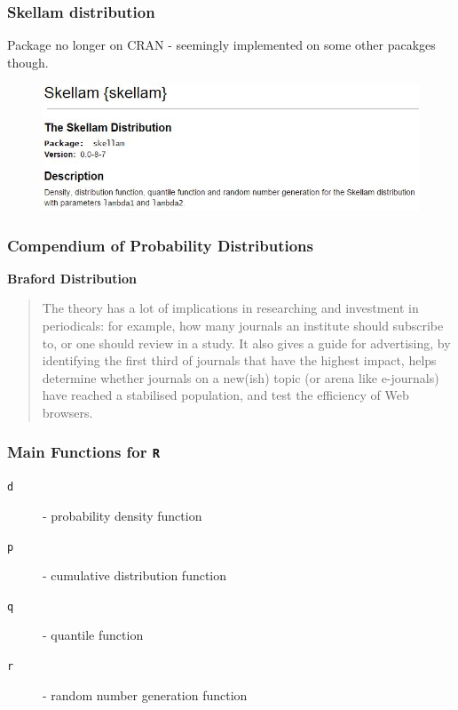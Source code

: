 \documentclass[MAIN.tex]{subfiles}
\begin{document}
\begin{frame}
\frametitle{Skellam distribution}
\large
Package no longer on CRAN - seemingly implemented on some other pacakges though.
	\begin{figure}
\centering
\includegraphics[width=0.7\linewidth]{images/skellampackage}
\caption{}
\label{fig:skellampackage}
\end{figure}
\end{frame}
\begin{frame}
	\frametitle{Compendium of Probability Distributions}
	\textbf{Braford Distribution}
\large
\begin{framed}
	\begin{quote}
	The theory has a lot of implications in researching and investment in periodicals: for example, how many journals an institute should subscribe to, or one should review in a study. It also gives a guide for advertising, by identifying the first third of journals that have the highest impact, helps determine whether journals on a new(ish) topic (or arena like e-journals) have reached a stabilised population, and test the efficiency of Web browsers.
\end{quote}
\end{framed}
\end{frame}

\begin{frame}
	\frametitle{Main Functions for \texttt{R}}
\begin{description}
\item[\texttt{d}] - probability density function
\item[\texttt{p}] - cumulative distribution function
\item[\texttt{q}] - quantile function
\item[\texttt{r}] - random number generation function
\end{description}

\end{frame}
\end{document}
